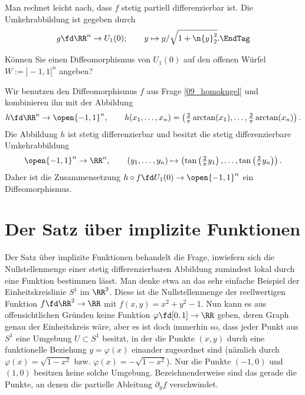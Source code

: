 \begin{antwort}
  Man rechnet leicht nach, dass $f$ stetig partiell differenzierbar ist. Die
  Umkehrabbildung ist gegeben durch
  \[
  g \fd \RR^n \to U_1(0); \qquad 
  y \mapsto y / \sqrt{1+\n{y}_2^2}. \EndTag
  \]
\end{antwort}



\begin{frage}
  Können Sie einen Diffeomorphismus von $U_1(0)$ auf den offenen Würfel 
  $W := ]-1,1[^n$ angeben?
\end{frage}

\begin{antwort}
  Wir benutzen den Diffeomorphismus $f$ aus Frage \ref{09_homokugel} 
  und kombinieren ihn mit der Abbildung 
  \[
  h\fd \RR^n \to \open{-1,1}^n , \qquad
  h(x_1,\ldots,x_n)=\left( \tfrac{2}{\pi} \arctan(x_1), \ldots, 
    \tfrac{2}{\pi} \arctan(x_n) \right).
  \]
  Die Abbildung $h$ ist stetig differenzierbar und besitzt die 
  stetig differenzierbare Umkehrabbildung
  \[
  \open{-1,1}^n  \to \RR^n, \qquad
  (y_1,\ldots,y_n) \mapsto 
  \left( \tan \left( \tfrac{2}{\pi}y_1 \right), \ldots, 
    \tan \left( \tfrac{2}{\pi}y_n \right)\right).
  \]
  Daher ist die Zusammensetzung $h\circ f\fd U_1(0) \to \open{-1,1}^n$ ein 
  Diffeomorphismus. \AntEnd
\end{antwort} 

\section{Der Satz über implizite Funktionen}

Der Satz über implizite Funktionen behandelt die Frage, inwiefern 
sich die Nullstellenmenge einer stetig differenzierbaren Abbildung 
zumindest lokal durch eine Funktion bestimmen lässt. Man denke etwa 
an das sehr einfache Beispiel 
der Einheitskreislinie $S^1$ im $\RR^2$. Diese ist die Nullstellenmenge der 
reellwertigen Funktion $f\fd \RR^2\to\RR$ mit $f(x,y)=x^2+y^2-1$. 
Nun kann es aus offensichtlichen Gründen keine Funktion 
$\varphi \fd [0,1]\to \RR$ geben, deren Graph genau der Einheitskreis wäre, 
aber es ist doch immerhin so, dass  jeder Punkt aus $S^1$ 
eine Umgebung $U \subset S^1$ besitzt, in der die Punkte $(x,y)$ durch 
eine funktionelle Beziehung $y=\varphi(x)$ einander zugeordnet sind 
(nämlich durch $\varphi(x)=\sqrt{1-x^2}$ bzw. $\varphi(x)=-\sqrt{1-x^2}$). 
Nur die Punkte $(-1,0)$ und $(1,0)$ besitzen keine solche Umgebung. 
Bezeichnenderweise sind das gerade die Punkte, 
an denen die partielle Ableitung $\partial_y f$ verschwindet. 

